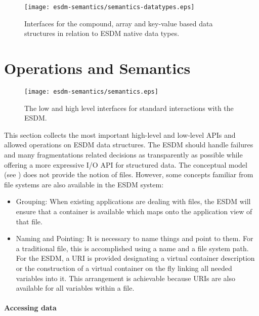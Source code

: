 \begin{figure}
	\centering
	\texttt{[image: esdm-semantics/semantics-datatypes.eps]}
	\caption{Interfaces for the compound, array and key-value based data structures in relation to ESDM native data types.}
	\label{fig:datatypes}
\end{figure}









\clearpage
\section{Operations and Semantics}
\label{sec: viewpoints/logical/semantics}


\begin{figure}
	\centering
	\texttt{[image: esdm-semantics/semantics.eps]}
	\caption{The low and high level interfaces for standard interactions with the ESDM.}
	\label{fig:apis ll and high}
\end{figure}

This section collects the most important high-level and low-level APIs and allowed operations on ESDM data structures.
The ESDM should handle failures and many fragmentations related decisions as transparently as possible while offering a more expressive I/O API for structured data.
The conceptual model (see ) does not provide the notion of files. However, some concepts familiar from file systems are also available in the ESDM system:
\begin{itemize}
\item Grouping: When existing applications are dealing with files, the ESDM will ensure that a container is available which maps onto the application view of that file.
\item Naming and Pointing: It is necessary to name things and point to them.
For a traditional file, this is accomplished using a name and a file system path.
For the ESDM, a URI is provided designating a virtual container description or the construction of a virtual container on the fly linking all needed variables into it. This arrangement is achievable because URIs are also available for all variables within a file.
\end{itemize}


\paragraph{Accessing data}

